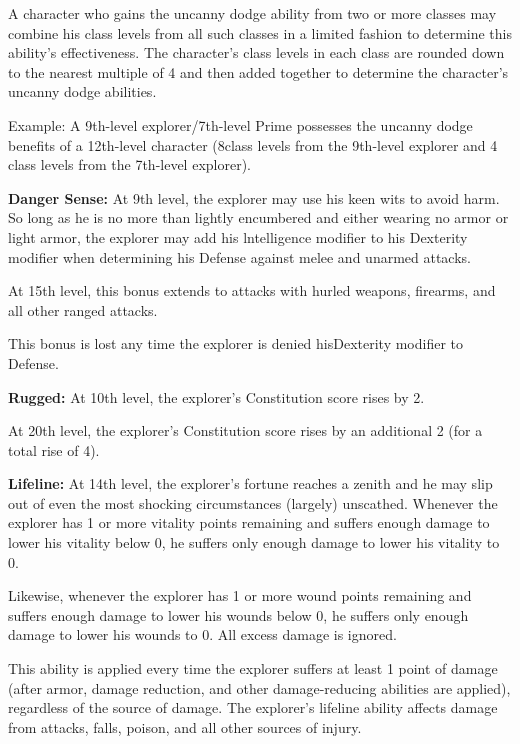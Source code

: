 A character who gains the uncanny dodge ability from two or more classes may combine his class levels from all such classes in a limited fashion to determine this ability's effectiveness. The character's class levels in each class are rounded down to the nearest multiple of 4 and then added together to determine the character's uncanny dodge abilities.

Example: A 9th-level explorer/7th-level Prime possesses the uncanny dodge benefits of a 12th-level character (8class levels from the 9th-level explorer and 4 class levels from the 7th-level explorer).

\textbf{Danger Sense:} At 9th level, the explorer may use his keen wits to avoid harm. So long as he is no more than lightly encumbered and either wearing no armor or light armor, the explorer may add his lntelligence modifier to his Dexterity modifier when determining his Defense against melee and unarmed attacks.

At 15th level, this bonus extends to attacks with hurled weapons, firearms, and all other ranged attacks.

This bonus is lost any time the explorer is denied hisDexterity modifier to Defense.

\textbf{Rugged:} At 10th level, the explorer's Constitution score rises by 2.

At 20th level, the explorer's Constitution score rises by an additional 2 (for a total rise of 4).

\textbf{Lifeline:} At 14th level, the explorer's fortune reaches a zenith and he may slip out of even the most shocking circumstances (largely) unscathed. Whenever the explorer has 1 or more vitality points remaining and suffers enough damage to lower his vitality below 0, he suffers only enough damage to lower his vitality to 0.

Likewise, whenever the explorer has 1 or more wound points remaining and suffers enough damage to lower his wounds below 0, he suffers only enough damage to lower his wounds to 0. All excess damage is ignored.

This ability is applied every time the explorer suffers at least 1 point of damage (after armor, damage reduction, and other damage-reducing abilities are applied), regardless of the source of damage. The explorer's lifeline ability affects damage from attacks, falls, poison, and all other sources of injury.



